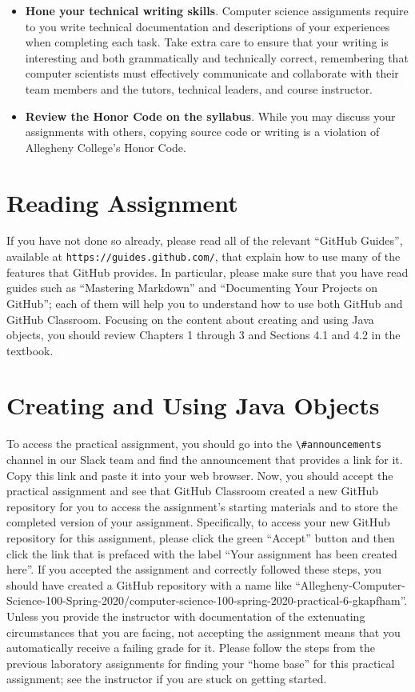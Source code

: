 \documentclass[11pt]{article}
\newcommand{\url}[1]{\lstinline{#1}}
\newcommand{\channel}[1]{\lstinline{#1}}
\begin{document}
\begin{itemize}
\item {\bf Hone your technical writing skills}. Computer science assignments
  require to you write technical documentation and descriptions of your
  experiences when completing each task. Take extra care to ensure that your
  writing is interesting and both grammatically and technically correct,
  remembering that computer scientists must effectively communicate and
  collaborate with their team members and the tutors, technical leaders, and
  course instructor.

\item {\bf Review the Honor Code on the syllabus}. While you may discuss your
  assignments with others, copying source code or writing is a violation of
  Allegheny College's Honor Code.

\end{itemize}

\section*{Reading Assignment}

If you have not done so already, please read all of the relevant ``GitHub
Guides'', available at \url{https://guides.github.com/}, that explain how to use
many of the features that GitHub provides. In particular, please make sure that
you have read guides such as ``Mastering Markdown'' and ``Documenting Your
Projects on GitHub''; each of them will help you to understand how to use both
GitHub and GitHub Classroom. Focusing on the content about creating and using
Java objects, you should review Chapters 1 through 3 and Sections 4.1 and 4.2 in
the textbook.

\section*{Creating and Using Java Objects}

To access the practical assignment, you should go into the
\channel{\#announcements} channel in our Slack team and find the announcement
that provides a link for it. Copy this link and paste it into your web browser.
Now, you should accept the practical assignment and see that GitHub Classroom
created a new GitHub repository for you to access the assignment's starting
materials and to store the completed version of your assignment. Specifically,
to access your new GitHub repository for this assignment, please click the green
``Accept'' button and then click the link that is prefaced with the label ``Your
assignment has been created here''. If you accepted the assignment and correctly
followed these steps, you should have created a GitHub repository with a name
like
``Allegheny-Computer-Science-100-Spring-2020/computer-science-100-spring-2020-practical-6-gkapfham''.
Unless you provide the instructor with documentation of the extenuating
circumstances that you are facing, not accepting the assignment means that you
automatically receive a failing grade for it. Please follow the steps from the
previous laboratory assignments for finding your ``home base'' for this
practical assignment; see the instructor if you are stuck on getting started.
\end{document}

